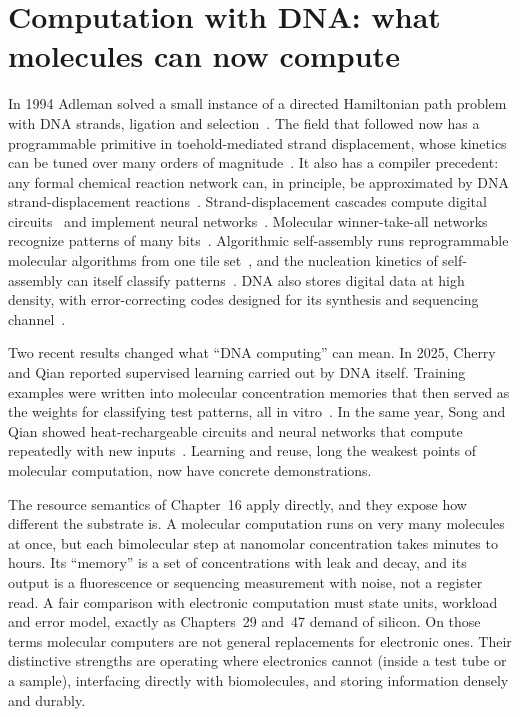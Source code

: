\section*{Computation with DNA: what molecules can now compute}
In 1994 Adleman solved a small instance of a directed Hamiltonian path problem with DNA
strands, ligation and selection~\cite{adleman1994}. The field that followed now has a
programmable primitive in toehold-mediated strand displacement, whose kinetics can be
tuned over many orders of magnitude~\cite{zhangwinfree2009}. It also has a compiler
precedent: any formal chemical reaction network can, in principle, be approximated by
DNA strand-displacement reactions~\cite{soloveichik2010}. Strand-displacement cascades
compute digital circuits~\cite{qianwinfree2011} and implement neural
networks~\cite{qianwinfreebruck2011}. Molecular winner-take-all networks recognize
patterns of many bits~\cite{cherryqian2018}. Algorithmic self-assembly runs
reprogrammable molecular algorithms from one tile set~\cite{woods2019}, and the
nucleation kinetics of self-assembly can itself classify patterns~\cite{evans2024}.
DNA also stores digital data at high density, with error-correcting codes designed for
its synthesis and sequencing channel~\cite{church2012,goldman2013,erlich2017}.

Two recent results changed what ``DNA computing'' can mean. In 2025, Cherry and Qian
reported supervised learning carried out by DNA itself. Training examples were written
into molecular concentration memories that then served as the weights for classifying
test patterns, all in vitro~\cite{cherryqian2025}. In the same year, Song and Qian showed
heat-rechargeable circuits and neural networks that compute repeatedly with new
inputs~\cite{songqian2025}. Learning and reuse, long the weakest points of molecular
computation, now have concrete demonstrations.

The resource semantics of Chapter~16 apply directly, and they expose how different the
substrate is. A molecular computation runs on very many molecules at once, but each
bimolecular step at nanomolar concentration takes minutes to hours. Its ``memory'' is a
set of concentrations with leak and decay, and its output is a fluorescence or
sequencing measurement with noise, not a register read. A fair comparison with
electronic computation must state units, workload and error model, exactly as
Chapters~29 and~47 demand of silicon. On those terms molecular computers are not general
replacements for electronic ones. Their distinctive strengths are operating where
electronics cannot (inside a test tube or a sample), interfacing directly with
biomolecules, and storing information densely and durably.

